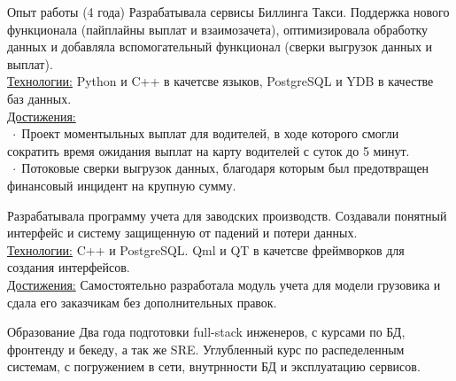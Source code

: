 \documentclass[12pt]{cutecv}
\newcommand{\listbullet}{$\; \cdot \;$}
\begin{document}
\begin{paracol}{2}
\begin{rightcolumn}
\begin{cvsection}{Опыт работы (4 года)}
  {Разрабатывала сервисы Биллинга Такси. Поддержка нового функционала (пайплайны выплат и взаимозачета), 
  оптимизировала обработку данных и добавляла вспомогательный функционал (сверки выгрузок данных и выплат). \\
  \underline{Технологии:} Python и C++ в качетсве языков, PostgreSQL и YDB в качестве баз данных. \\
  \underline{Достижения:} \\ \listbullet Проект моментыльных выплат для водителей, в ходе которого
  смогли сократить время ожидания выплат на карту водителей с суток до 5 минут. \\
  \listbullet Потоковые сверки выгрузок данных, благодаря которым был предотвращен финансовый инцидент на крупную сумму.}
  
  {Разрабатывала программу учета для заводских производств. Создавали понятный интерфейс
  и систему защищенную от падений и потери данных. \\
  \underline{Технологии:} C++ и PostgreSQL. Qml и QT в качетсве фреймворков для создания интерфейсов.\\
  \underline{Достижения:} Самостоятельно разработала модуль учета для модели грузовика и сдала его заказчикам без дополнительных правок.}
\end{cvsection}
\begin{cvsection}{Образование}
    {Два года подготовки full-stack инженеров, с курсами по БД, фронтенду и бекеду, а так же SRE.}
   {Углубленный курс по распеделенным системам, с погружением в сети, внутрнности БД и эксплуатацию сервисов. }
\end{cvsection}
\end{rightcolumn}
\end{paracol}
\end{document}
